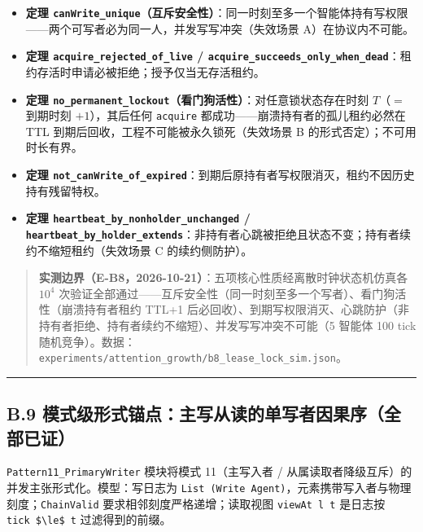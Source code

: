 \begin{itemize}
\tightlist
\item
  \textbf{定理
  \texttt{canWrite\_unique}（互斥安全性）}：同一时刻至多一个智能体持有写权限------两个可写者必为同一人，并发写写冲突（失效场景
  A）在协议内不可能。
\item
  \textbf{定理 \texttt{acquire\_rejected\_of\_live} /
  \texttt{acquire\_succeeds\_only\_when\_dead}}：租约存活时申请必被拒绝；授予仅当无存活租约。
\item
  \textbf{定理
  \texttt{no\_permanent\_lockout}（看门狗活性）}：对任意锁状态存在时刻
  \(T\)（\(=\) 到期时刻 \(+1\)），其后任何 \texttt{acquire}
  都成功------崩溃持有者的孤儿租约必然在 TTL
  到期后回收，工程不可能被永久锁死（失效场景 B
  的形式否定）；不可用时长有界。
\item
  \textbf{定理
  \texttt{not\_canWrite\_of\_expired}}：到期后原持有者写权限消灭，租约不因历史持有残留特权。
\item
  \textbf{定理 \texttt{heartbeat\_by\_nonholder\_unchanged} /
  \texttt{heartbeat\_by\_holder\_extends}}：非持有者心跳被拒绝且状态不变；持有者续约不缩短租约（失效场景
  C 的续约侧防护）。
\end{itemize}

\begin{quote}
\textbf{实测边界（E-B8，2026-10-21）}：五项核心性质经离散时钟状态机仿真各
\(10^4\)
次验证全部通过------互斥安全性（同一时刻至多一个写者）、看门狗活性（崩溃持有者租约
TTL+1
后必回收）、到期写权限消灭、心跳防护（非持有者拒绝、持有者续约不缩短）、并发写写冲突不可能（5
智能体 100 tick
随机竞争）。数据：\texttt{experiments/attention\_growth/b8\_lease\_lock\_sim.json}。
\end{quote}

\begin{center}\rule{0.5\linewidth}{0.5pt}\end{center}

\subsection{B.9
模式级形式锚点：主写从读的单写者因果序（全部已证）}\label{b.9-ux6a21ux5f0fux7ea7ux5f62ux5f0fux951aux70b9ux4e3bux5199ux4eceux8bfbux7684ux5355ux5199ux8005ux56e0ux679cux5e8fux5168ux90e8ux5df2ux8bc1}

\texttt{Pattern11\_PrimaryWriter} 模块将模式 11（主写入者 /
从属读取者降级互斥）的并发主张形式化。模型：写日志为
\texttt{List\ (Write\ Agent)}，元素携带写入者与物理刻度；\texttt{ChainValid}
要求相邻刻度严格递增；读取视图 \texttt{viewAt\ l\ t} 是日志按
\texttt{tick\ \$\textbackslash{}le\$\ t} 过滤得到的前缀。

